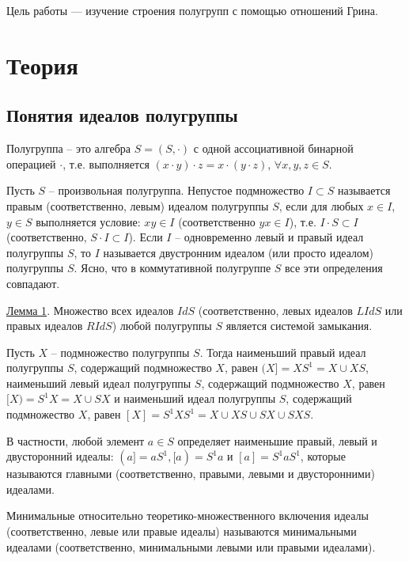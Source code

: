 \documentclass[bachelor, och, labwork]{shiza}
\begin{document}
	
	
	\tableofcontents
	
	\newpage
	
	Цель работы — изучение строения полугрупп с помощью отношений Грина.
	
	\section{Теория}
	    \subsection{Понятия идеалов полугруппы}

	Полугруппа – это алгебра $S = (S,\cdot)$ с одной ассоциативной бинарной операцией $\cdot$, т.е. выполняется $(x\cdot y)\cdot z = x\cdot (y\cdot z)$, $\forall x,y,z \in S$.

	Пусть $S$ – произвольная полугруппа. Непустое подмножество $I \subset  S$ называется правым (соответственно, левым) идеалом полугруппы $S$, если для любых $x \in I$,$y \in S$ выполняется условие: $xy \in I$ (соответственно $yx \in I$), т.е. $I \cdot S \subset I$ (соответственно, $S \cdot I \subset  I$). Если $I$ – одновременно левый и правый идеал полугруппы $S$, то $I$ называется двустронним идеалом (или просто идеалом) полугруппы $S$. Ясно, что в коммутативной полугруппе $S$ все эти определения совпадают.

	\underline{Лемма 1}. Множество всех идеалов $Id S$ (соответственно, левых идеалов $LId S$ или правых идеалов $RId S$) любой полугруппы $S$ является системой замыкания. 
	
	Пусть $X$ – подмножество полугруппы $S$. Тогда наименьший правый идеал полугруппы $S$, содержащий подмножество $X$, равен $(X] = XS^1  = X \cup XS$, наименьший левый идеал полугруппы $S$, содержащий подмножество $X$, равен $[X) = S^1 X = X \cup SX$ и наименьший идеал полугруппы $S$, содержащий подмножество $X$, равен $[X] = S^1 XS^1  = X \cup XS \cup SX \cup SXS$. 
	
	В частности, любой элемент $a \in S$ определяет наименьшие правый, левый и двусторонний идеалы: $(a] = aS^1  ,[a) = S^1 a$ и $[a] = S^1 aS^1$, которые называются главными (соответственно, правыми, левыми и двусторонними) идеалами. 
	
	Минимальные относительно теоретико-множественного включения идеалы (соответственно, левые или правые идеалы) называются минимальными идеалами (соответственно, минимальными левыми или правыми идеалами).
	
\end{document}
